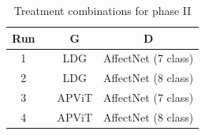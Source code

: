 \begin{table}[h]
\centering
\begin{tabular}{@{}cccc@{}}
\toprule
\textbf{Run} &  & \textbf{G} & \textbf{D} \\ \midrule
1            &  & LDG        & AffectNet (7 class)     \\
2            &  & LDG      & AffectNet (8 class)     \\
3            &  & APViT        & AffectNet (7 class)  \\
4            &  & APViT      & AffectNet (8 class) \\ \bottomrule
\end{tabular}
\caption{Treatment combinations for phase II}
\label{tab:p2-runs}
\end{table}